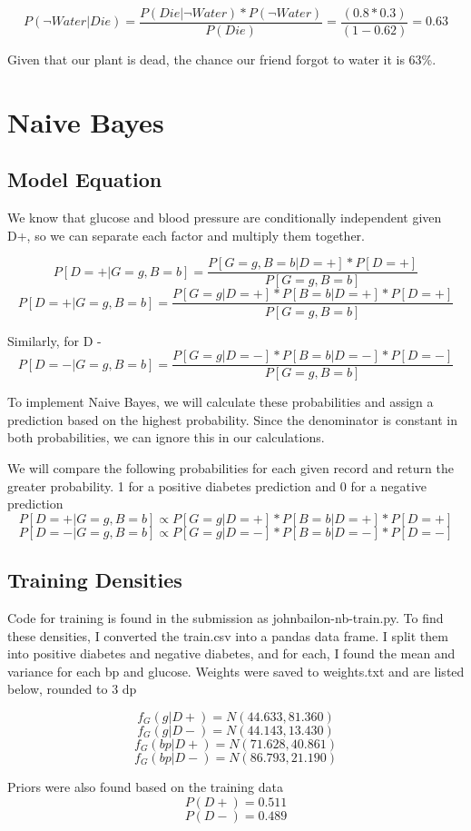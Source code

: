 \documentclass{article}
\begin{document}
\[P(\neg Water | Die) = \frac{P(Die | \neg Water) * P(\neg Water)}{P(Die)} = \frac{(0.8*0.3)}{(1-0.62)} = 0.63\]

Given that our plant is dead, the chance our friend forgot to water it is 63\%.

\newpage
\section{Naive Bayes}

\subsection{Model Equation}
We know that glucose and blood pressure are conditionally independent given D+, so we can separate each factor and multiply them together.

\[P[D=+ |G =g, B=b] = \frac{P[G=g,B=b|D=+] * P[D=+]}{P[G=g, B=b]} \]
\[P[D=+ |G =g, B=b] = \frac{P[G=g|D=+] * P[B=b|D=+] * P[D=+]}{P[G=g, B=b]} \]

Similarly, for D - 
\[P[D=- |G =g, B=b] = \frac{P[G=g|D=-] * P[B=b|D=-] * P[D=-]}{P[G=g, B=b]} \]

To implement Naive Bayes, we will calculate these probabilities and assign a prediction based on the highest probability. Since the denominator is constant in both probabilities, we can ignore this in our calculations.

We will compare the following probabilities for each given record and return the greater probability. 1 for a positive diabetes prediction and 0 for a negative prediction 
\[P[D=+ |G =g, B=b] \propto P[G=g|D=+] * P[B=b|D=+] * P[D=+] \]
\[P[D=- |G =g, B=b] \propto P[G=g|D=-] * P[B=b|D=-] * P[D=-] \]

\subsection{Training Densities}
Code for training is found in the submission as johnbailon-nb-train.py. To find these densities, I converted the train.csv into a pandas data frame. I split them into positive diabetes and negative diabetes, and for each, I found the mean and variance for each bp and glucose.
Weights were saved to weights.txt and are listed below, rounded to 3 dp

\[f_G(g | D+) = N(44.633, 81.360)\]
\[f_G(g | D-) = N(44.143, 13.430)\]
\[f_G(bp | D+) = N(71.628, 40.861) \]
\[f_G(bp | D-) = N(86.793, 21.190)\]

Priors were also found based on the training data
\[P(D+) = 0.511\]
\[P(D-) = 0.489\]
\end{document}
